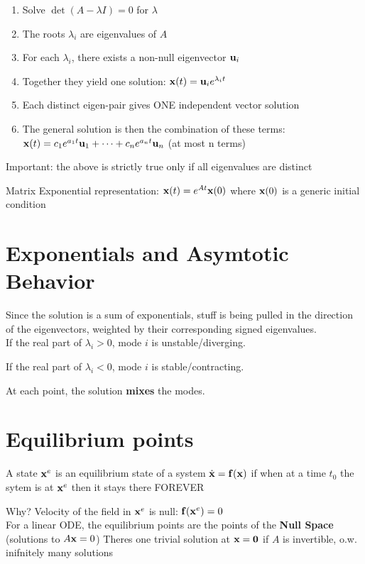 \documentclass{report}
\begin{document}
\begin{enumerate}
    \item Solve $\det(A - \lambda I) = 0$ for $\lambda$
    \item The roots $\lambda_i$ are eigenvalues of $A$
    \item For each $\lambda_i$, there exists a non-null eigenvector 
    $\mathbf{u}_i$ 
    \item Together they yield one solution: $\mathbf{x}(t) = \mathbf{u}_i e^{\lambda_i t}$
    \item Each distinct eigen-pair gives ONE independent vector solution
    \item The general solution is then the combination of these terms: 
    $\mathbf{x}(t) = c_1 e^{a_1 t} \mathbf{u}_1 + \dots + c_n e^{a_n t} \mathbf{u}_n$ (at most n terms)
\end{enumerate}

Important: the above is strictly true only if all eigenvalues are distinct

Matrix Exponential representation: $\mathbf{x}(t) = e^{A t} \mathbf{x}(0)$ where $\mathbf{x}(0)$ is a generic initial condition

\section*{Exponentials and Asymtotic Behavior}

Since the solution is a sum of exponentials, stuff is being pulled in the direction of the eigenvectors, 
weighted by their corresponding signed eigenvalues.
\\

If the real part of $\lambda_i > 0$, mode $i$ is unstable/diverging.

If the real part of $\lambda_i < 0$, mode $i$ is stable/contracting.

At each point, the solution \textbf{mixes} the modes.

\section*{Equilibrium points}

A state $\mathbf{x}^e$ is an equilibrium state of a system $\dot{\mathbf{x}} = \mathbf{f}(\mathbf{x})$ if 
when at a time $t_0$ the sytem is at $\mathbf{x}^e$ then it stays there FOREVER

Why? Velocity of the field in $\mathbf{x}^e$ is null: $\mathbf{f}(\mathbf{x}^e) = 0$
\\

For a linear ODE, the equilibrium points are the points of the \textbf{Null Space} (solutions to $A \mathbf{x} = 0$)
Theres one trivial solution at $\mathbf{x} = \mathbf{0}$ if $A$ is invertible, o.w. inifnitely many solutions
\end{document}

